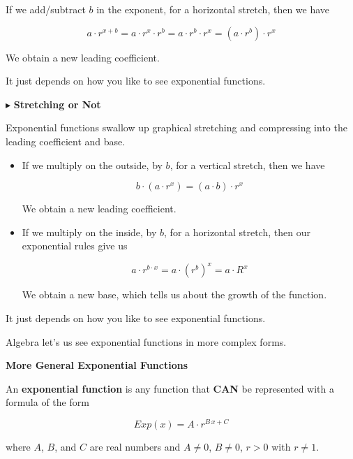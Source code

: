 \documentclass{ximera}
\begin{document}
If we add/subtract $b$ in the exponent, for a horizontal stretch, then we have

\[
a \cdot r^{x + b} = a \cdot r^x \cdot r^b = a \cdot r^b \cdot r^x = (a \cdot r^b) \cdot r^x
\]

We obtain a new leading coefficient. 

It just depends on how you like to see exponential functions. 

















$\blacktriangleright$ \textbf{\textcolor{blue!55!black}{Stretching or Not}} 



Exponential functions swallow up graphical stretching and compressing into the leading coefficient and base.


\begin{itemize}
\item If we multiply on the outside, by $b$, for a vertical stretch, then we have

\[
b \cdot (a \cdot r^x) = (a \cdot b) \cdot r^x
\]

We obtain a new leading coefficient. 






\item If we multiply on the inside, by $b$, for a horizontal stretch, then our exponential rules give us

\[
a \cdot r^{b \cdot x} = a \cdot (r^b)^x = a \cdot R^x
\]

We obtain a new base, which tells us about the growth of the function.


\end{itemize}


It just depends on how you like to see exponential functions. 







Algebra let's us see exponential functions in more complex forms.








\begin{definition} \textbf{\textcolor{green!50!black}{More General Exponential Functions}}

An \textbf{exponential function} is any function that \textbf{\textcolor{purple!85!blue}{CAN}} be represented with a formula of the form

\[     Exp(x) =    A \cdot r^{B \, x + C}          \]

where $A$, $B$, and $C$ are real numbers and $A \ne 0$, $B \ne 0$, $r > 0$ with $r \ne 1$.


\end{definition}
\end{document}

